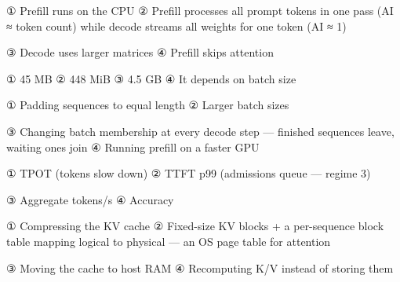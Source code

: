 
\begin{tbboptions}
  \item ① Prefill runs on the CPU        ② Prefill processes all prompt tokens in one pass (AI ≈ token count) while decode streams all weights for one token (AI ≈ 1)
  \item ③ Decode uses larger matrices        ④ Prefill skips attention
\end{tbboptions}


\begin{tbboptions}
  \item ① 45 MB        ② 448 MiB        ③ 4.5 GB        ④ It depends on batch size
\end{tbboptions}


\begin{tbboptions}
  \item ① Padding sequences to equal length        ② Larger batch sizes
  \item ③ Changing batch membership at every decode step — finished sequences leave, waiting ones join        ④ Running prefill on a faster GPU
\end{tbboptions}


\begin{tbboptions}
  \item ① TPOT (tokens slow down)        ② TTFT p99 (admissions queue — regime 3)
  \item ③ Aggregate tokens/s        ④ Accuracy
\end{tbboptions}


\begin{tbboptions}
  \item ① Compressing the KV cache        ② Fixed-size KV blocks + a per-sequence block table mapping logical to physical — an OS page table for attention
  \item ③ Moving the cache to host RAM        ④ Recomputing K/V instead of storing them
\end{tbboptions}

